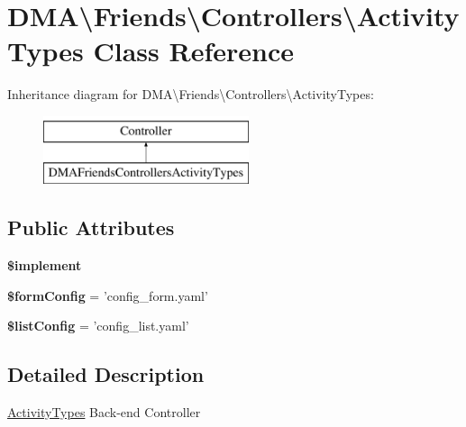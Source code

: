 \hypertarget{classDMA_1_1Friends_1_1Controllers_1_1ActivityTypes}{\section{D\-M\-A\textbackslash{}Friends\textbackslash{}Controllers\textbackslash{}Activity\-Types Class Reference}
\label{classDMA_1_1Friends_1_1Controllers_1_1ActivityTypes}
}
Inheritance diagram for D\-M\-A\textbackslash{}Friends\textbackslash{}Controllers\textbackslash{}Activity\-Types\-:\begin{figure}[H]
\begin{center}
\leavevmode
\includegraphics[height=2.000000cm]{d6/d9d/classDMA_1_1Friends_1_1Controllers_1_1ActivityTypes}
\end{center}
\end{figure}
\subsection*{Public Attributes}
\begin{DoxyCompactItemize}
\item 
{\bfseries \$implement}
\item 
\hypertarget{classDMA_1_1Friends_1_1Controllers_1_1ActivityTypes_abf63526872073fe5db2ab8b6360b03e4}{{\bfseries \$form\-Config} = 'config\-\_\-form.\-yaml'}\label{classDMA_1_1Friends_1_1Controllers_1_1ActivityTypes_abf63526872073fe5db2ab8b6360b03e4}

\item 
\hypertarget{classDMA_1_1Friends_1_1Controllers_1_1ActivityTypes_a104d438fcc651182015d73628605eb4b}{{\bfseries \$list\-Config} = 'config\-\_\-list.\-yaml'}\label{classDMA_1_1Friends_1_1Controllers_1_1ActivityTypes_a104d438fcc651182015d73628605eb4b}

\end{DoxyCompactItemize}


\subsection{Detailed Description}
\hyperlink{classDMA_1_1Friends_1_1Controllers_1_1ActivityTypes}{Activity\-Types} Back-\/end Controller 

